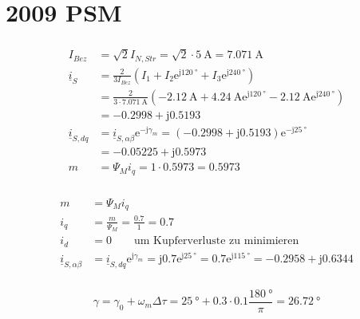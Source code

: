 \documentclass[11pt,a4paper]{scrartcl}
\newcommand{\mybr}[1]{\left(#1\right)}
\renewcommand{\j}{\mathrm{j}}
\renewcommand{\i}{\underline{i}}
\newcommand{\0}{_{\mybr{0}}}
\newcommand{\1}{_{\mybr{1}}}
\newcommand{\2}{_{\mybr{2}}}
\renewcommand{\e}{\mathrm{e}}
\newcommand{\isab}{\i_{S,\alpha\beta}}
\newcommand{\isdq}{\i_{S,dq}}
\begin{document}
\clearpage
\part{2009 PSM}
\section{}
\begin{align}
I_{Bez}&=\sqrt{2}I_{N,Str}=\sqrt{2}\cdot\SI{5}{\ampere}=\SI{7.071}{\ampere}\\
\i_S&=\frac{2}{3I_{Bez}}\mybr{I_1+I_2\e^{\j\SI{120}{\degree}}+I_3\e^{\j\SI{240}{\degree}}}\\
&=\frac{2}{3\cdot\SI{7.071}{\ampere}}\mybr{\SI{-2.12}{\ampere}+\SI{4.24}{\ampere}\e^{\j\SI{120}{\degree}}-\SI{2.12}{\ampere}\e^{\j\SI{240}{\degree}}}\\
&=\num{-0.2998}+\j\num{0.5193}\\
\isdq&=\isab\e^{-\j\gamma_m}=\mybr{\num{-0.2998}+\j\num{0.5193}}\e^{-\j\SI{25}{\degree}}\\
&=\num{-0.05225}+\j\num{0.5973}\\
m&=\Psi_M i_q=1\cdot\num{0.5973}=\num{0.5973}
\end{align}

\section{}
\begin{align}
m&=\Psi_M i_q\\
i_q&=\frac{m}{\Psi_M}=\frac{\num{0.7}}{1}=\num{0.7}\\
i_d&=0\quad\quad\text{um Kupferverluste zu minimieren}\\
\isab&=\isdq\e^{\j\gamma_m}=\j\num{0.7}\e^{\j\SI{25}{\degree}}=\num{0.7}\e^{\j\SI{115}{\degree}}=\num{-0.2958}+\j\num{0.6344}
\end{align}

\section{}
\subsection{}
\begin{equation}
\gamma=\gamma_0+\omega_m\Delta\tau=\SI{25}{\degree}+\num{0.3}\cdot\num{0.1}\frac{\SI{180}{\degree}}{\pi}=\SI{26.72}{\degree}
\end{equation}
\end{document}
